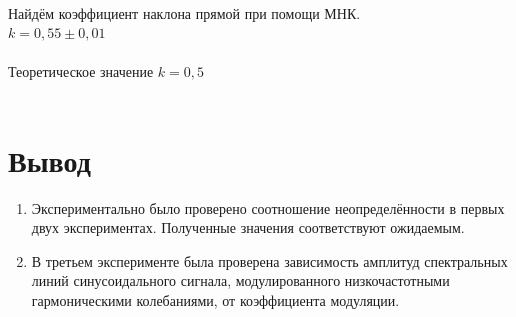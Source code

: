 \documentclass[11pt,a4paper]{article}
\begin{document}
\\
Найдём коэффициент наклона прямой при помощи МНК.
\\
$\boxed{k=0,55 \pm 0,01}$
\\\\
Теоретическое значение $k=0,5$
\\\\

\part*{Вывод}
\begin{enumerate}
	\item Экспериментально было проверено соотношение неопределённости в первых двух экспериментах. Полученные значения соответствуют ожидаемым.
	\item В третьем эксперименте была проверена зависимость амплитуд спектральных линий синусоидального сигнала, модулированного низкочастотными гармоническими колебаниями, от коэффициента модуляции.
\end{enumerate}
\end{document}
